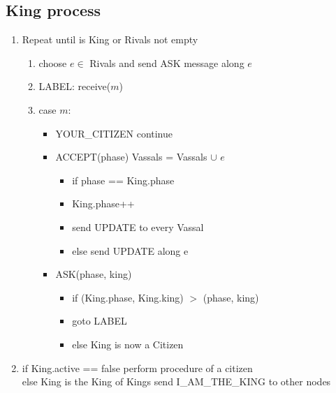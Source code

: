 \documentclass{article}
\begin{document}
\subsection*{King process}
\begin{enumerate}
    \item Repeat until is King or Rivals not empty
    \begin{enumerate}
        \item choose \(e \in\) Rivals and send ASK message along \(e\)
        \item LABEL: receive(\(m\))
        \item case \(m\):
        \begin{itemize}
            \item[] YOUR\_CITIZEN continue
            \item[] ACCEPT(phase) Vassals = Vassals \(\cup\) \(e\) \begin{itemize}
                \item[] if phase == King.phase
                \item[] King.phase++
                \item[] send UPDATE to every Vassal
                \item[] else send UPDATE along e
            \end{itemize}
            \item[]ASK(phase, king)
            \begin{itemize}
                \item if (King.phase, King.king) \(>\) (phase, king)
                \item goto LABEL
                \item else King is now a Citizen
            \end{itemize}
        \end{itemize}
    \end{enumerate}
    \item if King.active == false perform procedure of a citizen
    \\ else King is the King of Kings send I\_AM\_THE\_KING to other nodes
\end{enumerate}
\end{document}

